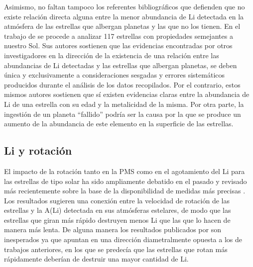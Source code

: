 Asimismo, no faltan tampoco los referentes bibliográficos que defienden que no existe relación directa alguna entre la menor abundancia de Li detectada en la atmósfera de las estrellas que albergan planetas y las que no los tienen. En el trabajo de \cite{Baumann2010} se procede a analizar 117 estrellas con propiedades semejantes a nuestro Sol. Sus autores sostienen que las evidencias encontradas por otros investigadores en la dirección de la existencia de una relación entre las abundancias de Li detectadas y las estrellas que albergan planetas, se deben única y exclusivamente a consideraciones sesgadas y errores sistemáticos producidos durante el análisis de los datos recopilados. Por el contrario, estos mismos autores sostienen que sí existen evidencias claras entre la abundancia de Li de una estrella con su edad y la metalicidad de la misma. Por otra parte, la ingestión de un planeta “fallido” podría ser la causa por la que se produce un aumento de la abundancia de este elemento en la superficie de las estrellas.\par

\subsection{Li y rotación}
El impacto de la rotación tanto en la PMS como en el agotamiento del Li para las estrellas de tipo solar ha sido ampliamente debatido en el pasado \cite{Pinsonneault1997,Jeffries2004,Somers2014} y revisado más recientemente sobre la base de la disponibilidad de medidas más precisas \cite{Bouvier2016}. Los resultados sugieren una conexión entre la velocidad de rotación de las estrellas y la A(Li) detectada en sus atmósferas estelares, de modo que las estrellas que giran más rápido destruyen menos Li que las que lo hacen de manera más lenta. De alguna manera los resultados publicados por \cite{Bouvier2016} son inesperados ya que apuntan en una dirección diametralmente opuesta a los de trabajos anteriores, en los que se predecía que las estrellas que rotan más rápidamente deberían de destruir una mayor cantidad de Li.\par 

